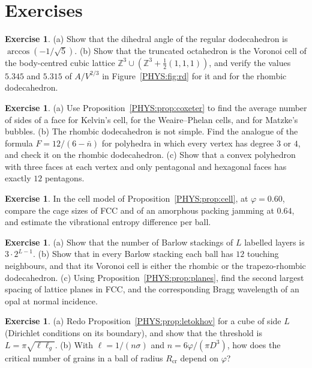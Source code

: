 \documentclass[11pt,openany]{book}
\theoremstyle{plain}
\theoremstyle{definition}
\newtheorem{exercise}[theorem]{Exercise}
\theoremstyle{remark}
\newcommand{\Z}{\mathbb{Z}}
\begin{document}
\section*{Exercises}

\begin{exercise}
(a) Show that the dihedral angle of the regular dodecahedron is $\arccos(-1/\sqrt5)$. (b) Show that the
truncated octahedron is the Voronoi cell of the body-centred cubic lattice $\Z^3\cup(\Z^3+\frac12(1,1,1))$, and
verify the values $5.345$ and $5.315$ of $A/V^{2/3}$ in Figure~\ref{PHYS:fig:rd} for it and for the rhombic
dodecahedron.
\end{exercise}

\begin{exercise}
(a) Use Proposition~\ref{PHYS:prop:coxeter} to find the average number of sides of a face for Kelvin's cell, for
the Weaire--Phelan cells, and for Matzke's bubbles. (b) The rhombic dodecahedron is not simple. Find the
analogue of the formula $F=12/(6-\bar n)$ for polyhedra in which every vertex has degree $3$ or $4$, and check it
on the rhombic dodecahedron. (c) Show that a convex polyhedron with three faces at each vertex and only
pentagonal and hexagonal faces has exactly $12$ pentagons.
\end{exercise}

\begin{exercise}
In the cell model of Proposition~\ref{PHYS:prop:cell}, at $\varphi=0.60$, compare the cage sizes of FCC and of an amorphous packing jamming at $0.64$, and
estimate the vibrational entropy difference per ball.
\end{exercise}

\begin{exercise}
(a) Show that the number of Barlow stackings of $L$ labelled layers is $3\cdot2^{L-1}$. (b) Show that in every
Barlow stacking each ball has $12$ touching neighbours, and that its Voronoi cell is either the rhombic or the
trapezo-rhombic dodecahedron. (c) Using Proposition~\ref{PHYS:prop:planes}, find the second largest spacing of
lattice planes in FCC, and the corresponding Bragg wavelength of an opal at normal incidence.
\end{exercise}

\begin{exercise}
(a) Redo Proposition~\ref{PHYS:prop:letokhov} for a cube of side $L$ (Dirichlet conditions on its boundary),
and show that the threshold is $L=\pi\sqrt{\ell\ell_g}$.
(b) With $\ell=1/(n\sigma)$ and $n=6\varphi/(\pi D^3)$, how does the critical number of grains in a ball of
radius $R_{\mathrm{cr}}$ depend on $\varphi$?
\end{exercise}
\end{document}
